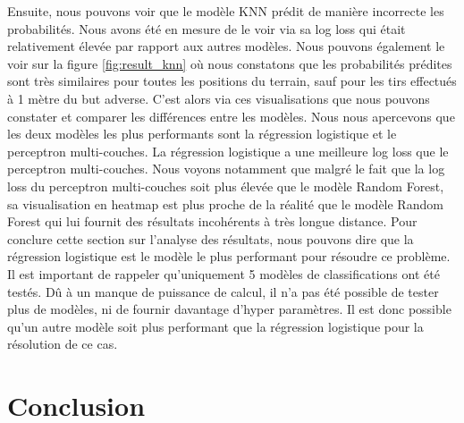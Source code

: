 \documentclass[12pt]{article}
\begin{document}
\newline\newline
Ensuite, nous pouvons voir que le modèle KNN prédit de manière incorrecte les probabilités.
Nous avons été en mesure de le voir via sa log loss qui était relativement élevée par rapport aux autres modèles.
Nous pouvons également le voir sur la figure \ref{fig:result_knn} où nous constatons que les probabilités prédites sont très similaires pour toutes les positions du terrain, sauf pour les tirs effectués à 1 mètre du but adverse.
\newline\newline
C'est alors via ces visualisations que nous pouvons constater et comparer les différences entre les modèles.
Nous nous apercevons que les deux modèles les plus performants sont la régression logistique et le perceptron multi-couches.
La régression logistique a une meilleure log loss que le perceptron multi-couches.
Nous voyons notamment que malgré le fait que la log loss du perceptron multi-couches soit plus élevée que le modèle Random Forest, sa visualisation en heatmap est plus proche de la réalité que le modèle Random Forest qui lui fournit des résultats incohérents à très longue distance.
\newline\newline
Pour conclure cette section sur l'analyse des résultats, nous pouvons dire que la régression logistique est le modèle le plus performant pour résoudre ce problème. 
Il est important de rappeler qu'uniquement 5 modèles de classifications ont été testés.
Dû à un manque de puissance de calcul, il n'a pas été possible de tester plus de modèles, ni de fournir davantage d'hyper paramètres.
Il est donc possible qu'un autre modèle soit plus performant que la régression logistique pour la résolution de ce cas.
\newpage
\section{Conclusion}
\end{document}
